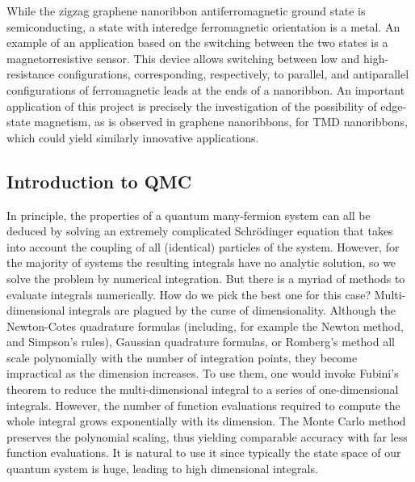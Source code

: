 While the zigzag graphene nanoribbon antiferromagnetic ground state is semiconducting, a state with interedge ferromagnetic orientation is a metal.
An example of an application based on the switching between the two states is a magnetorresistive sensor.
This device allows switching between low and high-resistance configurations, corresponding, respectively, to parallel, and antiparallel configurations of ferromagnetic leads at the ends of a nanoribbon.
An important application of this project is precisely the investigation of the possibility of edge-state magnetism, as is observed in graphene nanoribbons, for TMD nanoribbons, which could yield similarly innovative applications.


\subsection{Introduction to \acl{QMC}}

In principle, the properties of a quantum many-fermion system can all be deduced by solving an extremely complicated Schr\"odinger equation that takes into account the coupling of all (identical) particles of the system.
However, for the majority of systems the resulting integrals have no analytic solution, so we solve the problem by numerical integration.
But there is a myriad of methods to evaluate integrals numerically.
How do we pick the best one for this case? 
Multi-dimensional integrals are plagued by the curse of dimensionality.
Although the Newton-Cotes quadrature formulas (including, for example the Newton method, and Simpson's rules), Gaussian quadrature formulas, or Romberg's method all scale polynomially with the number of integration points, they become impractical as the dimension increases.
To use them, one would invoke Fubini's theorem to reduce the multi-dimensional integral to a series of one-dimensional integrals.
However, the number of function evaluations required to compute the whole integral grows exponentially with its dimension.
The Monte Carlo method preserves the polynomial scaling, thus yielding comparable accuracy with far less function evaluations.
It is natural to use it since typically the state space of our quantum system is huge, leading to high dimensional integrals.

